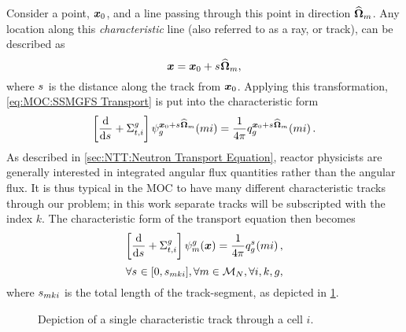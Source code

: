 {{        Consider a point, $\boldsymbol{x}_0$, and a line passing through this point in direction $\dirm$.
        Any location along this \emph{characteristic} line (also referred to as a ray, or track), can be described as
        \begin{equation}\label{eq:MOC:Characteristic Ray}
            \loc = \loc_0 + \len\dirm,
        \end{equation}
        where $\len$ is the distance along the track from $\boldsymbol{x}_0$.
        Applying this transformation, \cref{eq:MOC:SSMGFS Transport} is put into the characteristic form
        \begin{equation}\label{eq:MOC:Characteristic Form Deriv 1}
            \left[\deriv{}{\len} + \xst\right]\aflux[mi][g][\loc_0 + \len\dirm] = \rfourpi\source[mi][g][\loc_0 + \len\dirm].
        \end{equation}
        As described in \cref{sec:NTT:Neutron Transport Equation}, reactor physicists are generally interested in integrated angular flux quantities rather than the angular flux.
        It is thus typical in the \ac{MOC} to have many different characteristic tracks through our problem; in this work separate tracks will be subscripted with the index $k$.
        The characteristic form of the transport equation then becomes
        \begin{equation}\label{eq:MOC:MOC Equation Generic}
            \left[\deriv{}{\len} + \xst\right]\aflux = \rfourpi\source[mi][g][\len],
        \end{equation}
        \begin{equation*}
            \forall \len \in [0,\segl], \forall m\in\angquad, \forall i,k,g,
        \end{equation*}
        where $\segl$ is the total length of the track-segment, as depicted in \cref{fig:MOC:MOC Coordinate System}.

        \begin{figure}[h]
            \centering
            \def\svgwidth{0.4\linewidth}
            
            \caption{Depiction of a single characteristic track through a cell $i$.}
            \label{fig:MOC:MOC Coordinate System}
        \end{figure}

}}
